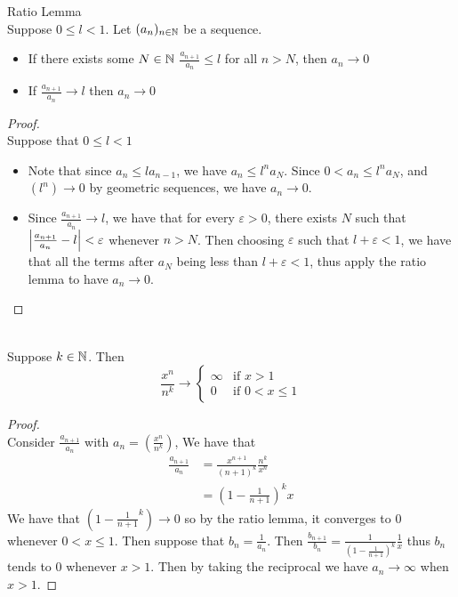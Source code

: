 \documentclass[a4paper]{article}
\begin{document}
\begin{thm}{Ratio Lemma}{}\\ Suppose $0\leq l<1$. Let $(a_n)_{n\in\mathbb{N}}$ be a sequence. 
\begin{itemize}
\item If there exists some $N\in\mathbb{N}$ $\frac{a_{n+1}}{a_n}\leq l$ for all $n>N$, then $a_n\to 0$
\item If $\frac{a_{n+1}}{a_n}\to l$ then $a_n\to0$
\end{itemize}
\begin{proof}\\ Suppose that $0\leq l<1$
\begin{itemize}
\item Note that since $a_n\leq la_{n-1}$, we have $a_n\leq l^na_N$. Since $0<a_n\leq l^na_N$, and $(l^n)\to 0$ by geometric sequences, we have $a_n\to 0$. 
\item Since $\frac{a_{n+1}}{a_n}\to l$, we have that for every $\varepsilon>0$, there exists $N$ such that $\abs{\frac{a_{n+1}}{a_n}-l}<\varepsilon$ whenever $n>N$. Then choosing $\varepsilon$ such that $l+\varepsilon<1$, we have that all the terms after $a_N$ being less than $l+\varepsilon<1$, thus apply the ratio lemma to have $a_n\to 0$. 
\end{itemize}
\end{proof}
\end{thm}

\begin{thm}{}{}\\ Suppose $k\in\mathbb{N}$. Then
$$\frac{x^n}{n^k}\to\begin{cases}
\infty & \text{if $x>1$} \\
0 & \text{if $0<x\leq1$} 
\end{cases}$$
\begin{proof}\\ Consider $\frac{a_{n+1}}{a_n}$ with $a_n=\left(\frac{x^n}{n^k}\right)$, We have that 
\begin{align*}
\frac{a_{n+1}}{a_n}&=\frac{x^{n+1}}{(n+1)^k}\frac{n^k}{x^n} \\
&=\left(1-\frac{1}{n+1}\right)^kx
\end{align*}
We have that $\left(1-\frac{1}{n+1}^k\right)\to 0$ so by the ratio lemma, it converges to $0$ whenever $0<x\leq1$. Then suppose that $b_n=\frac{1}{a_n}$. Then $\frac{b_{n+1}}{b_n}=\frac{1}{\left(1-\frac{1}{n+1}\right)^k}\frac{1}{x}$ thus $b_n$ tends to $0$ whenever $x>1$. Then by taking the reciprocal we have $a_n\to\infty$ when $x>1$. 
\end{proof}
\end{thm}
\end{document}
